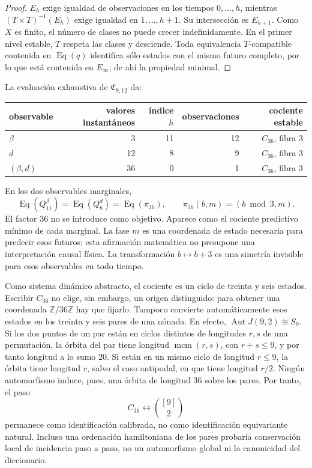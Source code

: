 \begin{proof}
\(E_h\) exige igualdad de observaciones en los tiempos \(0,\ldots,h\), mientras
\((T\times T)^{-1}(E_h)\) exige igualdad en \(1,\ldots,h+1\). Su intersección es
\(E_{h+1}\). Como \(X\) es finito, el número de clases no puede crecer
indefinidamente. En el primer nivel estable, \(T\) respeta las clases y
desciende. Toda equivalencia \(T\)-compatible contenida en
\(\operatorname{Eq}(q)\)
identifica sólo estados con el mismo futuro completo, por lo que está
contenida en \(E_\infty\); de ahí la propiedad minimal.
\end{proof}

La evaluación exhaustiva de \(\mathfrak C_{9,12}\) da:
\begin{center}
\small
\begin{tabular}{@{}lrrrr@{}}
\toprule
observable & valores instantáneos & índice \(h\) & observaciones & cociente estable\\
\midrule
\(\beta\) & 3 & 11 & 12 & \(C_{36}\), fibra 3\\
\(d\) & 12 & 8 & 9 & \(C_{36}\), fibra 3\\
\((\beta,d)\) & 36 & 0 & 1 & \(C_{36}\), fibra 3\\
\bottomrule
\end{tabular}
\end{center}
En los dos observables marginales,
\[
\operatorname{Eq}(Q_{11}^{\beta})
=\operatorname{Eq}(Q_8^d)
=\operatorname{Eq}(\pi_{36}),
\qquad
\pi_{36}(b,m)=(b\bmod3,m).
\]
El factor \(36\) no se introduce como objetivo. Aparece como el cociente
predictivo mínimo de cada marginal. La fase \(m\) es una coordenada de estado
necesaria para predecir esos futuros; esta afirmación matemática no presupone
una interpretación causal física. La transformación \(b\mapsto b+3\) es una
simetría invisible para esos observables en todo tiempo.

Como sistema dinámico abstracto, el cociente es un ciclo de treinta y seis
estados. Escribir \(C_{36}\) no elige, sin embargo, un origen distinguido:
para obtener una coordenada \(\mathbb Z/36\mathbb Z\) hay que fijarlo. Tampoco
convierte automáticamente esos estados en los treinta y seis pares de una
nónada. En efecto, \(\operatorname{Aut}J(9,2)\cong S_9\). Si los dos puntos de
un par están en ciclos distintos de longitudes \(r,s\) de una permutación, la
órbita del par tiene longitud \(\operatorname{mcm}(r,s)\), con \(r+s\leq9\),
y por tanto longitud a lo sumo \(20\). Si están en un mismo ciclo de longitud
\(r\leq9\), la órbita tiene longitud \(r\), salvo el caso antipodal, en que
tiene longitud \(r/2\). Ningún automorfismo induce, pues, una órbita de longitud
\(36\) sobre los pares. Por tanto, el paso
\[
C_{36}\longleftrightarrow \binom{[9]}2
\]
permanece como identificación calibrada, no como identificación equivariante natural.
Incluso una ordenación hamiltoniana de los pares probaría conservación local
de incidencia paso a paso, no un automorfismo global ni la canonicidad del
diccionario.


